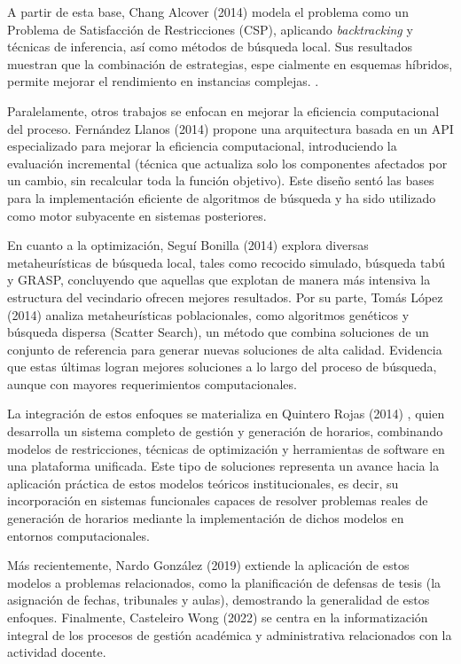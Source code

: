 \documentclass{article}
\begin{document}
A partir de esta base, Chang Alcover (2014) \cite{chang2014} modela el problema como un Problema de Satisfacción de Restricciones (CSP), aplicando \textit{backtracking} y técnicas de inferencia, así como métodos de búsqueda local.  Sus resultados muestran que la combinación de estrategias, espe
cialmente en esquemas híbridos, permite mejorar el rendimiento en instancias complejas. \cite{chang2014}. 

Paralelamente, otros trabajos se enfocan en mejorar la eficiencia computacional del proceso. Fernández Llanos (2014)  \cite{fernandez2014} propone una arquitectura basada en un API especializado para mejorar la eficiencia computacional, introduciendo la evaluación incremental (técnica que actualiza solo los componentes afectados por un cambio, sin recalcular toda la función objetivo). Este diseño sentó las bases para la implementación eficiente de algoritmos de búsqueda y ha sido utilizado como motor subyacente en sistemas posteriores.

En cuanto a la optimización, Seguí Bonilla (2014) \cite{segui2014} explora diversas metaheurísticas de búsqueda local, tales como recocido simulado, búsqueda tabú y GRASP, concluyendo que aquellas que explotan de manera más intensiva la estructura del vecindario ofrecen mejores resultados. Por su parte, Tomás López (2014) \cite{tomas2014}  analiza metaheurísticas poblacionales, como algoritmos genéticos y búsqueda dispersa (Scatter Search), un método que combina soluciones de un conjunto de referencia para generar nuevas soluciones de alta calidad. Evidencia que estas últimas logran mejores soluciones a lo largo del proceso de búsqueda, aunque con mayores requerimientos computacionales. 

La integración de estos enfoques se materializa en Quintero Rojas (2014) \cite{quintero2014},  quien desarrolla un sistema completo de gestión y generación de horarios, combinando modelos de restricciones, técnicas de optimización y herramientas de software en una plataforma unificada. Este tipo de soluciones representa un avance hacia la aplicación práctica de estos modelos teóricos institucionales, es decir, su incorporación en sistemas funcionales capaces de resolver problemas reales de generación de horarios mediante la implementación de dichos modelos en entornos computacionales.

Más recientemente, Nardo González (2019) \cite{nardo2019} extiende la aplicación de estos modelos
a problemas relacionados, como la planificación de defensas de tesis (la asignación de fechas, tribunales y aulas), demostrando la generalidad de estos enfoques. Finalmente, Casteleiro Wong (2022) \cite{casteleiro2022} se centra en la informatización integral de los procesos de gestión académica y administrativa relacionados con la actividad docente.
\end{document}
